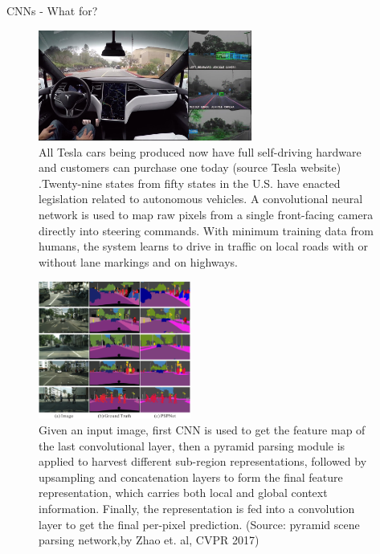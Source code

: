 
\begin{vbframe}{CNNs - What for?}
  \begin{figure}
    \centering
    \includegraphics[width=7cm]{figure/tesla_autopilot.jpg}
    \caption{All Tesla cars being produced now have full self-driving hardware and customers can purchase one today (source Tesla website) .Twenty-nine states from fifty states in the U.S. have enacted legislation related to autonomous vehicles. A convolutional neural network is used to map raw pixels from a single front-facing camera directly into steering commands. With minimum training data from humans, the system learns to drive in traffic on local roads with or without lane markings and on highways.}
  \end{figure}
\framebreak

  \begin{figure}
    \centering
    \includegraphics[width=5cm]{figure/cityscapes_visual.png}
    \caption{Given an input image, first CNN is used to get the feature map of the last convolutional layer, then a pyramid parsing module is applied to harvest different sub-region representations, followed by upsampling and concatenation layers to form the final feature representation, which carries both local and global context information. Finally, the representation is fed into a convolution layer to get the final per-pixel prediction. (Source: pyramid scene parsing network,by Zhao et. al, CVPR 2017) }
  \end{figure}
\framebreak


\end{vbframe}
